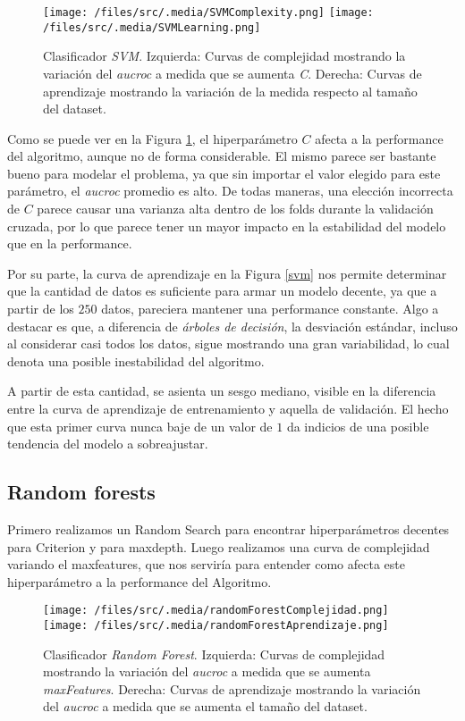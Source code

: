 \begin{figure}[!htbp] 
    \centering
    \texttt{[image: /files/src/.media/SVMComplexity.png]}
    \texttt{[image: /files/src/.media/SVMLearning.png]}
    \caption{Clasificador \textit{SVM}. Izquierda: Curvas de complejidad mostrando la variación del \textit{aucroc} a medida que se aumenta \textit{C}. Derecha: Curvas de aprendizaje mostrando la variación de la medida respecto al tamaño del dataset.}
    \label{SVMCurves}
\end{figure}

Como se puede ver en la Figura \ref{SVMCurves}, el hiperparámetro $C$ afecta a la performance del algoritmo, aunque no de forma considerable. El mismo parece ser bastante bueno para modelar el problema, ya que sin importar el valor elegido para este parámetro, el \textit{aucroc} promedio es alto. De todas maneras, una elección incorrecta de $C$ parece causar una varianza alta dentro de los folds durante la validación cruzada, por lo que parece tener un mayor impacto en la estabilidad del modelo que en la performance.
 
Por su parte, la curva de aprendizaje en la Figura \ref{svm} nos permite determinar que la cantidad de datos es suficiente para armar un modelo decente, ya que a partir de los $250$ datos, pareciera mantener una performance constante. Algo a destacar es que, a diferencia de \textit{árboles de decisión}, la desviación estándar, incluso al considerar casi todos los datos, sigue mostrando una gran variabilidad, lo cual denota una posible inestabilidad del algoritmo. 

A partir de esta cantidad, se asienta un sesgo mediano, visible en la diferencia entre la curva de aprendizaje de entrenamiento y aquella de validación. El hecho que esta primer curva nunca baje de un valor de $1$ da indicios de una posible tendencia del modelo a sobreajustar. 

\subsection{Random forests}

Primero realizamos un Random Search para encontrar hiperparámetros decentes para Criterion y para maxdepth. Luego realizamos una curva de complejidad variando el maxfeatures, que nos serviría para entender como afecta este hiperparámetro a la performance del Algoritmo. 

\begin{figure}[!htbp]
    \centering
    \texttt{[image: /files/src/.media/randomForestComplejidad.png]}
    \texttt{[image: /files/src/.media/randomForestAprendizaje.png]}
    \caption{Clasificador \textit{Random Forest}. Izquierda: Curvas de complejidad mostrando la variación del \textit{aucroc} a medida que se aumenta \textit{maxFeatures}. Derecha: Curvas de aprendizaje mostrando la variación del \textit{aucroc} a medida que se aumenta el tamaño del dataset.}
    \label{RF}
\end{figure}

